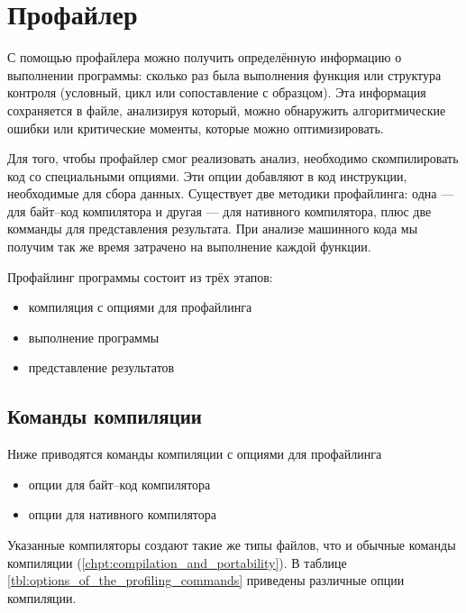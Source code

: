 \section {Профайлер}
\label{sec:profiling}

С помощью профайлера можно получить определённую информацию о выполнении 
программы: сколько раз была выполнения функция или структура контроля 
(условный, цикл или сопоставление с образцом). Эта информация сохраняется в 
файле, анализируя который, можно обнаружить алгоритмические ошибки или 
критические моменты, которые можно оптимизировать.

Для того, чтобы профайлер смог реализовать анализ, необходимо скомпилировать код 
со специальными опциями. Эти опции добавляют в код инструкции, необходимые для 
сбора данных. Существует две методики профайлинга: одна --- для байт--код 
компилятора и другая --- для нативного компилятора, плюс две комманды для 
представления результата. При анализе машинного кода мы получим так же время 
затрачено на выполнение каждой функции.

Профайлинг программы состоит из трёх этапов: 

\begin{itemize}
	\item компиляция с опциями для профайлинга 

	\item выполнение программы

	\item представление результатов
\end{itemize}

\subsection {Команды компиляции}
\label{subsec:compilation_commands}

Ниже приводятся команды компиляции с опциями для профайлинга 

\begin{itemize}
	\item {} опции для байт--код компилятора

	\item {} опции для нативного компилятора
\end{itemize}

Указанные компиляторы создают такие же типы файлов, что и обычные команды 
компиляции (\ref{chpt:compilation_and_portability}). В таблице 
\ref{tbl:options_of_the_profiling_commands} приведены различные опции 
компиляции.

